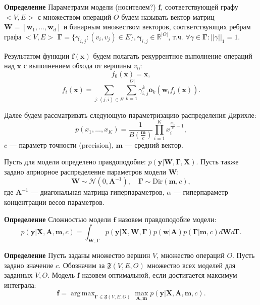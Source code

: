\documentclass[12pt]{article}
\DeclareMathOperator*{\argmax}{arg\,max}
\begin{document}
\textbf{Определение} Параметрами модели (носителем?) $\mathbf{f}$, соответствующей графу $<V,E>$ с множеством операций $O$ будем называть вектор матриц $\mathbf{W} = [\mathbf{w}_1, \dots, \mathbf{w}_d]$ и бинарным множеством векторов, соответствующих ребрам графа $<V,E>$  $\boldsymbol{\Gamma} = \{\boldsymbol{\gamma}_{i,j}: (v_i,v_j) \in E \}, \boldsymbol{\gamma}_{i,j} \in \mathbb{R}^{|O|}$, т.ч. $\forall \gamma \in \boldsymbol{\Gamma}: ||\gamma||_1 = 1$.

Результатом функции $\mathbf{f}(\mathbf{x})$ будем полагать рекуррентное выполнение операций над $\mathbf{x}$ с выполнением обхода от вершины $v_0$:
\[
    f_0(\mathbf{x}) = \mathbf{x},
\]
\[
    f_i(\mathbf{x}) = \sum_{j: (j,i) \in E} \sum_{k = 1}^{|O|} {\gamma}^k_{i,j} \mathbf{o}_{k}  (\mathbf{w}_i f_j(\mathbf{x})). 
\]

Далее будем рассматривать следующую параметризацию распределения Дирихле:
\[
    p(x_1,\dots,x_K) = \frac{1}{B(\frac{\mathbf{m}}{c})}  \prod_{i=1}^K x^{\frac{m_i}{c} - 1}_i,
\]
$c$ --- параметр точности (precision), $\mathbf{m}$ --- средний вектор.

Пусть для модели определено правдоподобие: $p(\mathbf{y}|\mathbf{W},\boldsymbol{\Gamma}, \mathbf{X})$. Пусть также задано априорное распределение параметров модели $\mathbf{W}$:
\[
    \mathbf{W} \sim \mathcal{N}(0, \mathbf{A}^{-1}), \quad \boldsymbol{\Gamma} \sim \text{Dir}(\mathbf{m}, c),
\]
где $\mathbf{A}^{-1}$ --- диагональная матрица гиперпараметров, $\alpha$ --- гиперпараметр концентрации весов параметров.

\textbf{Определение} Сложностью модели $\mathbf{f}$ назовем правдоподобие модели: 
\begin{equation}
\label{eq:evidence}
	p(\mathbf{y}|\mathbf{X},\mathbf{A},\mathbf{m}, c) = \int_{\mathbf{W}, \boldsymbol{\Gamma} } p(\mathbf{y}|\mathbf{X},\mathbf{W},  \boldsymbol{\Gamma})p(\mathbf{w}|\mathbf{A})p(\boldsymbol{\Gamma}|\mathbf{m}, c)d\mathbf{W}d\mathbf{\Gamma}.
\end{equation}


\textbf{Определение} Пусть заданы множество вершин $V$, множество операций $O$. Пусть задано значение $c$. Обозначим за $\mathfrak{F}(V,E,O)$ множество всех моделей для заданных $V,O$.
Модель $\mathbf{f}$ назовем оптимальной, если достигается максимум интеграла:
\[
    \mathbf{f} = \argmax_{\mathbf{f}' \in \mathfrak{F}(V,E,O)}\max_{\mathbf{A}, \mathbf{m}} p(\mathbf{y}|\mathbf{X},\mathbf{A},\mathbf{m}, c).
\]

\newpage
\end{document}
